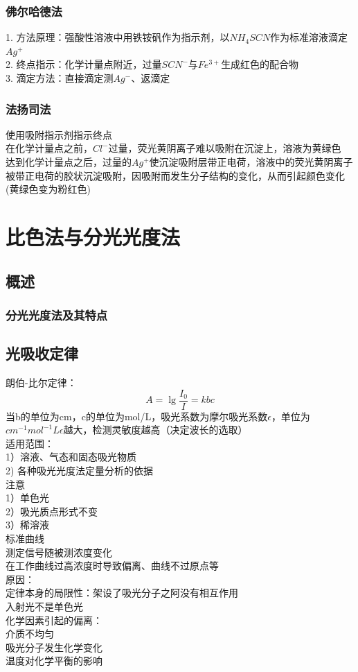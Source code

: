 \documentclass[utf8,a4paper,12pt]{ctexart}
\begin{document}
\subsubsection{佛尔哈德法}
1. 方法原理：强酸性溶液中用铁铵矾作为指示剂，以$NH_4SCN$作为标准溶液滴定$Ag^+$\\
2. 终点指示：化学计量点附近，过量$SCN^-$与$Fe^{3+}$生成红色的配合物\\
3. 滴定方法：直接滴定测$Ag^-$、返滴定\\
\subsubsection{法扬司法}
使用吸附指示剂指示终点\\
在化学计量点之前，$Cl^-$过量，荧光黄阴离子难以吸附在沉淀上，溶液为黄绿色\\
达到化学计量点之后，过量的$Ag^+$使沉淀吸附层带正电荷，溶液中的荧光黄阴离子被带正电荷的胶状沉淀吸附，因吸附而发生分子结构的变化，从而引起颜色变化(黄绿色变为粉红色)\\

\newpage

\section{比色法与分光光度法}
\subsection{概述}
\subsubsection{分光光度法及其特点}
\subsection{光吸收定律}
朗伯-比尔定律：
\[A = \lg\frac{I_0}{I} = kbc\]
当b的单位为cm，c的单位为mol/L，吸光系数为摩尔吸光系数$\epsilon$，单位为$cm^{-1}mol^{-1}L$$\epsilon$越大，检测灵敏度越高（决定波长的选取）\\
适用范围：\\
1）溶液、气态和固态吸光物质\\
2) 各种吸光光度法定量分析的依据\\
注意\\
1）单色光\\
2）吸光质点形式不变\\
3）稀溶液\\
标准曲线\\
测定信号随被测浓度变化\\
在工作曲线过高浓度时导致偏离、曲线不过原点等\\
原因：\\定律本身的局限性：架设了吸光分子之阿没有相互作用\\入射光不是单色光\\
化学因素引起的偏离：\\介质不均匀\\吸光分子发生化学变化\\温度对化学平衡的影响
\end{document}
